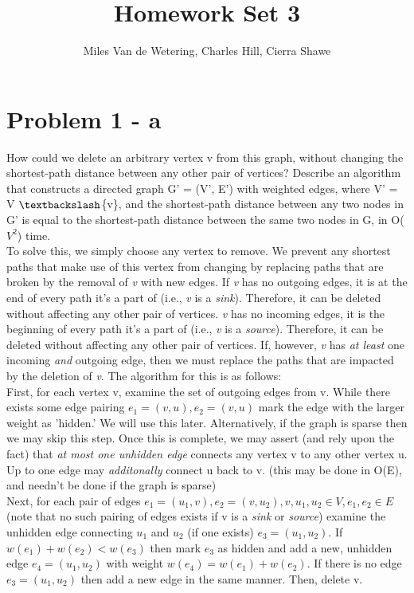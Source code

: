 \documentclass[]{article}
\title{Homework Set 3}
\author{Miles Van de Wetering, Charles Hill, Cierra Shawe}
\begin{document}
\maketitle

\section*{Problem 1 - a}
How could we delete an arbitrary vertex v from this graph, without changing the shortest-path distance
between any other pair of vertices? Describe an algorithm that constructs a directed graph G' = (V', E') with weighted edges, where V' = V $\textbackslash$\{v\}, and the shortest-path distance between any two nodes in G' is equal to the shortest-path distance between the same two nodes in G, in O($V^2$) time.\\

To solve this, we simply choose any vertex to remove. We prevent any shortest paths that make use of this vertex from changing by replacing paths that are broken by the removal of \textit{v} with new edges. If \textit{v} has no outgoing edges, it is at the end of every path it's a part of (i.e., \textit{v} is a \textit{sink}). Therefore, it can be deleted without affecting any other pair of vertices. \textit{v} has no incoming edges, it is the beginning of every path it's a part of (i.e., \textit{v} is a \textit{source}). Therefore, it can be deleted without affecting any other pair of vertices. If, however, \textit{v} has \textit{at least} one incoming \textit{and} outgoing edge, then we must replace the paths that are impacted by the deletion of \textit{v}. The algorithm for this is as follows: \\

First, for each vertex v, examine the set of outgoing edges from v. While there exists some edge pairing $e_1 = (v, u), e_2 = (v, u)$ mark the edge with the larger weight as 'hidden.' We will use this later. Alternatively, if the graph is sparse then we may skip this step. Once this is complete, we may assert (and rely upon the fact) that \emph{at most one unhidden edge} connects any vertex v to any other vertex u. Up to one edge may \emph{additonally} connect u back to v. (this may be done in O(E), and needn't be done if the graph is sparse)\\

Next, for each pair of edges $e_1 = (u_1, v), e_2 = (v, u_2), v, u_1, u_2 \in{V}, e_1, e_2 \in{E}$ (note that no such pairing of edges exists if v is a \emph{sink} or \emph{source}) examine the unhidden edge connecting $u_1$ and $u_2$ (if one exists) $e_3 = (u_1, u_2)$. If $w(e_1) + w(e_2) < w(e_3)$ then mark $e_3$ as hidden and add a new, unhidden edge $e_4 = (u_1, u_2)$ with weight $w(e_4) = w(e_1) + w(e_2)$. If there is no edge $e_3 = (u_1, u_2)$  then add a new edge in the same manner. Then, delete v. \\
\end{document}
